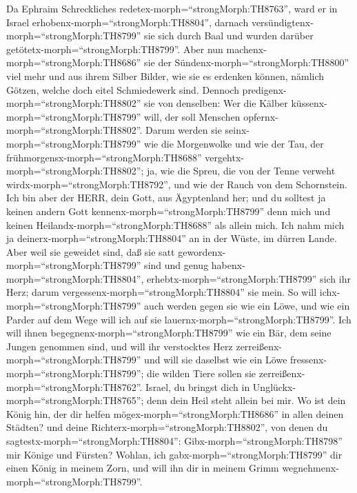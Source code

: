  Da Ephraim Schreckliches
redetex-morph=``strongMorph:TH8763'', ward er in Israel
erhobenx-morph=``strongMorph:TH8804'', darnach
versündigtenx-morph=``strongMorph:TH8799'' sie sich durch Baal und
wurden darüber getötetx-morph=``strongMorph:TH8799''.  Aber
nun machenx-morph=``strongMorph:TH8686'' sie der
Sündenx-morph=``strongMorph:TH8800'' viel mehr und aus ihrem Silber
Bilder, wie sie es erdenken können, nämlich Götzen, welche doch eitel
Schmiedewerk sind. Dennoch predigenx-morph=``strongMorph:TH8802'' sie
von denselben: Wer die Kälber küssenx-morph=``strongMorph:TH8799'' will,
der soll Menschen opfernx-morph=``strongMorph:TH8802''. 
Darum werden sie seinx-morph=``strongMorph:TH8799'' wie die Morgenwolke
und wie der Tau, der frühmorgensx-morph=``strongMorph:TH8688''
vergehtx-morph=``strongMorph:TH8802''; ja, wie die Spreu, die von der
Tenne verweht wirdx-morph=``strongMorph:TH8792'', und wie der Rauch von
dem Schornstein.  Ich bin aber der HERR, dein Gott, aus
Ägyptenland her; und du solltest ja keinen andern Gott
kennenx-morph=``strongMorph:TH8799'' denn mich und keinen
Heilandx-morph=``strongMorph:TH8688'' als allein mich.  Ich
nahm mich ja deinerx-morph=``strongMorph:TH8804'' an in der Wüste, im
dürren Lande.  Aber weil sie geweidet sind, daß sie satt
gewordenx-morph=``strongMorph:TH8799'' sind und genug
habenx-morph=``strongMorph:TH8804'',
erhebtx-morph=``strongMorph:TH8799'' sich ihr Herz; darum
vergessenx-morph=``strongMorph:TH8804'' sie mein.  So will
ichx-morph=``strongMorph:TH8799'' auch werden gegen sie wie ein Löwe,
und wie ein Parder auf dem Wege will ich auf sie
lauernx-morph=``strongMorph:TH8799''.  Ich will ihnen
begegnenx-morph=``strongMorph:TH8799'' wie ein Bär, dem seine Jungen
genommen sind, und will ihr verstocktes Herz
zerreißenx-morph=``strongMorph:TH8799'' und will sie daselbst wie ein
Löwe fressenx-morph=``strongMorph:TH8799''; die wilden Tiere sollen sie
zerreißenx-morph=``strongMorph:TH8762''.  Israel, du bringst
dich in Unglückx-morph=``strongMorph:TH8765''; denn dein Heil steht
allein bei mir.  Wo ist dein König hin, der dir helfen
mögex-morph=``strongMorph:TH8686'' in allen deinen Städten? und deine
Richterx-morph=``strongMorph:TH8802'', von denen du
sagtestx-morph=``strongMorph:TH8804'': Gibx-morph=``strongMorph:TH8798''
mir Könige und Fürsten?  Wohlan, ich
gabx-morph=``strongMorph:TH8799'' dir einen König in meinem Zorn, und
will ihn dir in meinem Grimm wegnehmenx-morph=``strongMorph:TH8799''.
